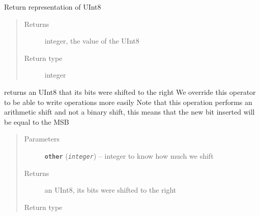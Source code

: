 \documentclass[letterpaper,10pt,english]{sphinxmanual}
\begin{document}
\begin{fulllineitems}
\begin{fulllineitems}
\end{fulllineitems}


\begin{fulllineitems}
\label{datatypes.integers:datatypes.integers.UInt8.UInt8.__repr__}
Return representation of UInt8
\begin{quote}\begin{description}
\item[{Returns}] \leavevmode
integer, the value of the UInt8

\item[{Return type}] \leavevmode
integer

\end{description}\end{quote}

\end{fulllineitems}


\begin{fulllineitems}
\label{datatypes.integers:datatypes.integers.UInt8.UInt8.__rshift__}
returns an UInt8 that its bits were shifted to the right
We override this operator to be able to write operations more easily
Note that this operation performs an arithmetic shift and not a binary shift, this means
that the new bit inserted will be equal to the MSB
\begin{quote}\begin{description}
\item[{Parameters}] \leavevmode
\textbf{\texttt{other}} (\emph{\texttt{integer}}) -- integer to know how much we shift

\item[{Returns}] \leavevmode
an UInt8, its bits were shifted to the right

\item[{Return type}] \leavevmode
{\hyperref[datatypes.integers:datatypes.integers.UInt8.UInt8]{}}

\end{description}\end{quote}

\end{fulllineitems}



\end{fulllineitems}
\end{document}

